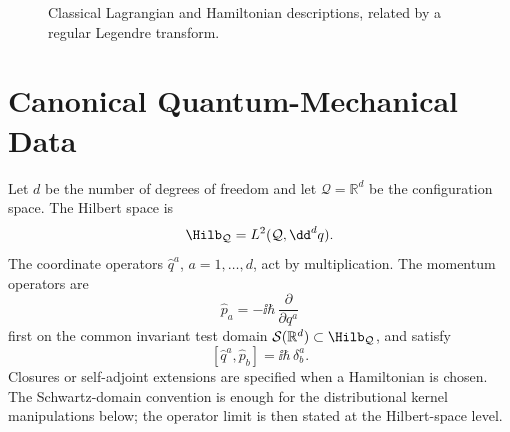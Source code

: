 \begin{figure}[htbp]
\centering
{}
\caption{Classical Lagrangian and Hamiltonian descriptions, related by a
regular Legendre transform.}
\label{fig:classical-lagrangian-hamiltonian-data}
\end{figure}

\section{Canonical Quantum-Mechanical Data}

Let \(d\) be the number of degrees of freedom and let
\(\mathcal Q=\mathbb R^d\) be the configuration space. The Hilbert space is
\[
  \Hilb_{\mathcal Q}=L^2(\mathcal Q,\dd^dq).
\]
The coordinate operators \(\widehat q^a\), \(a=1,\ldots,d\), act by
multiplication. The momentum operators are
\[
  \widehat p_a=-\ii\hbar\,\frac{\partial}{\partial q^a}
\]
first on the common invariant test domain
\(\mathcal S(\mathbb R^d)\subset\Hilb_{\mathcal Q}\), and satisfy
\[
  [\widehat q^a,\widehat p_b]=\ii\hbar\,\delta^a_b.
\]
Closures or self-adjoint extensions are specified when a Hamiltonian is
chosen.  The Schwartz-domain convention is enough for the distributional kernel
manipulations below; the operator limit is then stated at the Hilbert-space
level.


